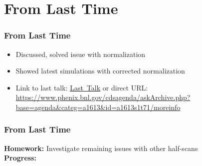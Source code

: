 \section{From Last Time}
\label{sec:from_last_time}

\begin{frame}
  \frametitle{From Last Time}
  \begin{itemize}
    \item Discussed, solved issue with normalization
    \item Showed latest simulations with corrected normalization
    \item Link to last talk:
      \href{https://www.phenix.bnl.gov/cdsagenda/askArchive.php?base=agenda&categ=a1613&id=a1613s1t71/moreinfo}{Last~Talk}
      or direct URL: \url{https://www.phenix.bnl.gov/cdsagenda/askArchive.php?base=agenda&categ=a1613&id=a1613s1t71/moreinfo}
  \end{itemize}
\end{frame}

\begin{frame}
  \frametitle{From Last Time}
  \textbf{Homework:} Investigate remaining issues with other half-scans\\
  \textbf{Progress:} \\
\end{frame}
